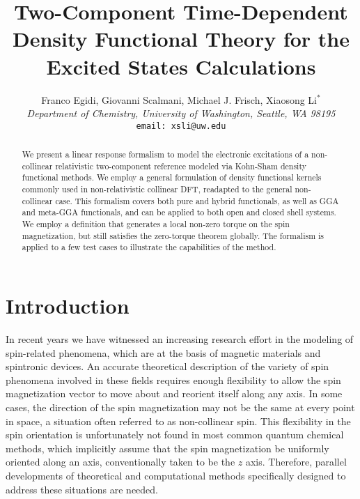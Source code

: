 \documentclass[12pt]{article}
\begin{document}
\title{Two-Component Time-Dependent Density Functional Theory for the Excited States Calculations}
\author{Franco Egidi, Giovanni Scalmani, Michael J. Frisch, Xiaosong Li$^*$ \\[12pt]
\emph{Department of Chemistry, University of Washington, Seattle, WA 98195} \\[12pt]
\texttt{email: xsli@uw.edu}}
\maketitle


\begin{abstract}
We present a linear response formalism to model the electronic excitations of a non-collinear relativistic two-component reference modeled via Kohn-Sham density functional methods.
We employ a general formulation of density functional kernels commonly used in non-relativistic collinear DFT, readapted to the general non-collinear case.
This formalism covers both pure and hybrid functionals, as well as GGA and meta-GGA functionals, and can be applied to both open and closed shell systems.
We employ a definition that generates a local non-zero torque on the spin magnetization, but still satisfies the zero-torque theorem globally.
The formalism is applied to a few test cases to illustrate the capabilities of the method.
\end{abstract}

\pagebreak

\section{Introduction}
In recent years we have witnessed an increasing research effort in the modeling of spin-related phenomena, which are at the basis of magnetic materials and spintronic devices.\cite{Sanvito11_3336,Sanvito05_335,Nagahama07_165202,Neuhauser05_204714}
An accurate theoretical description of the variety of spin phenomena involved in these fields requires enough flexibility to allow the spin magnetization vector to move about and reorient itself along any axis.
In some cases, the direction of the spin magnetization may not be the same at every point in space, a situation often referred to as non-collinear spin.
This flexibility in the spin orientation is unfortunately not found in most common quantum chemical methods, which implicitly assume that the spin magnetization be uniformly oriented along an axis, conventionally taken to be the $z$ axis.
Therefore, parallel developments of theoretical and computational methods specifically designed to address these situations are needed.
\end{document}
